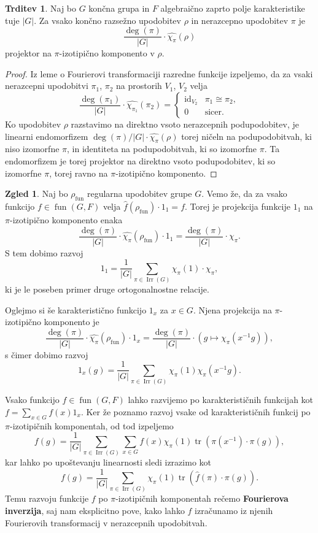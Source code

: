 \documentclass[11pt]{book}
\DeclareMathOperator\tr{tr}
\DeclareMathOperator\Irr{Irr}
\DeclareMathOperator\fun{fun}
\DeclareMathOperator\id{id}
\def\definicija{\color{rdeca}\bf}
\theoremstyle{definition}
\theoremstyle{zgled}
\newtheorem{zgled}[theorem]{Zgled}
\theoremstyle{zgledbrezstevilke}
\theoremstyle{odprtproblem}
\theoremstyle{domacanaloga}
\newenvironment{dokaz}
    {\color{siva}\begin{proof}}
    {\end{proof}}
\theoremstyle{izrek}
\newtheorem{trditev}[theorem]{Trditev}
\begin{document}
\begin{trditev}
Naj bo $G$ končna grupa in $F$ algebraično zaprto polje karakteristike tuje $|G|$. Za vsako končno razsežno upodobitev $\rho$ in nerazcepno upodobitev $\pi$ je
\[
    \frac{\deg(\pi)}{|G|} \cdot \widehat{\chi_{\pi}}(\rho)
\]
projektor na $\pi$-izotipično komponento v $\rho$.
\end{trditev}
\begin{dokaz}
Iz leme o Fourierovi transformaciji razredne funkcije izpeljemo, da za vsaki nerazcepni upodobitvi $\pi_1$, $\pi_2$ na prostorih $V_1$, $V_2$ velja
\[
    \frac{\deg(\pi_1)}{|G|} \cdot \widehat{\chi_{\pi_1}}(\pi_2) = \begin{cases}
        {\textstyle \id_{V_2}} & \pi_1 \cong \pi_2, \\
        0 & \text{sicer.}
    \end{cases}
\]
Ko upodobitev $\rho$ razstavimo na direktno vsoto nerazcepnih podupodobitev, je linearni endomorfizem $\deg(\pi)/|G| \cdot \widehat{\chi_{\pi}}(\rho)$ torej ničeln na podupodobitvah, ki niso izomorfne $\pi$, in identiteta na podupodobitvah, ki so izomorfne $\pi$. Ta endomorfizem je torej projektor na direktno vsoto podupodobitev, ki so izomorfne $\pi$, torej ravno na $\pi$-izotipično komponento.
\end{dokaz}

\begin{zgled}
Naj bo $\rho_{\fun}$ regularna upodobitev grupe $G$. Vemo že, da za vsako funkcijo $f \in \fun(G,F)$ velja $\hat{f}(\rho_{\fun}) \cdot 1_1 = f$. Torej je projekcija funkcije $1_1$ na $\pi$-izotipično komponento enaka
\[
    \frac{\deg(\pi)}{|G|} \cdot \widehat{\chi_{\pi}}(\rho_{\fun}) \cdot 1_1 = 
    \frac{\deg(\pi)}{|G|} \cdot \chi_{\pi}.
\]
S tem dobimo razvoj
\[
    1_1 = \frac{1}{|G|} \sum_{\pi \in \Irr(G)} \chi_{\pi}(1) \cdot \chi_{\pi},
\]
ki je le poseben primer druge ortogonalnostne relacije.

Oglejmo si še karakteristično funkcijo $1_x$ za $x \in G$. Njena projekcija na $\pi$-izotipično komponento je
\[
    \frac{\deg(\pi)}{|G|} \cdot \widehat{\chi_{\pi}}(\rho_{\fun}) \cdot 1_x = 
    \frac{\deg(\pi)}{|G|} \cdot \left( g \mapsto \chi_{\pi}(x^{-1}g) \right),
\]
s čimer dobimo razvoj
\[
    1_x(g) = \frac{1}{|G|} \sum_{\pi \in \Irr(G)} \chi_{\pi}(1) \chi_{\pi}(x^{-1} g).
\]
\end{zgled}

Vsako funkcijo $f \in \fun(G,F)$ lahko razvijemo po karakterističnih funkcijah kot $f = \sum_{x \in G} f(x) 1_x$. Ker že poznamo razvoj vsake od karakterističnih funkcij po $\pi$-izotipičnih komponentah, od tod izpeljemo
\[
    f(g) = \frac{1}{|G|} \sum_{\pi \in \Irr(G)} \sum_{x \in G} f(x) \chi_{\pi}(1) \tr \left( \pi(x^{-1}) \cdot \pi(g) \right),
\]
kar lahko po upoštevanju linearnosti sledi izrazimo kot 
\[
    f(g) = \frac{1}{|G|} \sum_{\pi \in \Irr(G)} \chi_{\pi}(1) \tr \left( \hat{f}(\pi) \cdot \pi(g) \right).
\]
Temu razvoju funkcije $f$ po $\pi$-izotipičnih komponentah rečemo {\definicija Fourierova inverzija}, saj nam eksplicitno pove, kako lahko $f$ izračunamo iz njenih Fourierovih transformacij v nerazcepnih upodobitvah.
\end{document}
